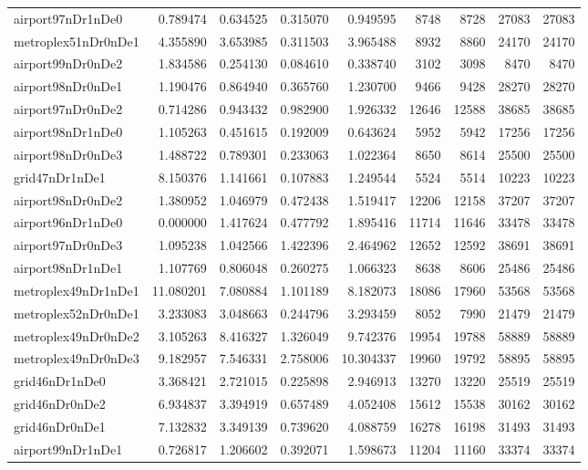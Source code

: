 \begin{longtable}{|l|r|r|r|r|r|r|r|r|}
airport97nDr1nDe0 & 0.789474 & 0.634525 & 0.315070 & 0.949595 & 8748 & 8728 & 27083 & 27083 \\
metroplex51nDr0nDe1 & 4.355890 & 3.653985 & 0.311503 & 3.965488 & 8932 & 8860 & 24170 & 24170 \\
airport99nDr0nDe2 & 1.834586 & 0.254130 & 0.084610 & 0.338740 & 3102 & 3098 & 8470 & 8470 \\
airport98nDr0nDe1 & 1.190476 & 0.864940 & 0.365760 & 1.230700 & 9466 & 9428 & 28270 & 28270 \\
airport97nDr0nDe2 & 0.714286 & 0.943432 & 0.982900 & 1.926332 & 12646 & 12588 & 38685 & 38685 \\
airport98nDr1nDe0 & 1.105263 & 0.451615 & 0.192009 & 0.643624 & 5952 & 5942 & 17256 & 17256 \\
airport98nDr0nDe3 & 1.488722 & 0.789301 & 0.233063 & 1.022364 & 8650 & 8614 & 25500 & 25500 \\
grid47nDr1nDe1 & 8.150376 & 1.141661 & 0.107883 & 1.249544 & 5524 & 5514 & 10223 & 10223 \\
airport98nDr0nDe2 & 1.380952 & 1.046979 & 0.472438 & 1.519417 & 12206 & 12158 & 37207 & 37207 \\
airport96nDr1nDe0 & 0.000000 & 1.417624 & 0.477792 & 1.895416 & 11714 & 11646 & 33478 & 33478 \\
airport97nDr0nDe3 & 1.095238 & 1.042566 & 1.422396 & 2.464962 & 12652 & 12592 & 38691 & 38691 \\
airport98nDr1nDe1 & 1.107769 & 0.806048 & 0.260275 & 1.066323 & 8638 & 8606 & 25486 & 25486 \\
metroplex49nDr1nDe1 & 11.080201 & 7.080884 & 1.101189 & 8.182073 & 18086 & 17960 & 53568 & 53568 \\
metroplex52nDr0nDe1 & 3.233083 & 3.048663 & 0.244796 & 3.293459 & 8052 & 7990 & 21479 & 21479 \\
metroplex49nDr0nDe2 & 3.105263 & 8.416327 & 1.326049 & 9.742376 & 19954 & 19788 & 58889 & 58889 \\
metroplex49nDr0nDe3 & 9.182957 & 7.546331 & 2.758006 & 10.304337 & 19960 & 19792 & 58895 & 58895 \\
grid46nDr1nDe0 & 3.368421 & 2.721015 & 0.225898 & 2.946913 & 13270 & 13220 & 25519 & 25519 \\
grid46nDr0nDe2 & 6.934837 & 3.394919 & 0.657489 & 4.052408 & 15612 & 15538 & 30162 & 30162 \\
grid46nDr0nDe1 & 7.132832 & 3.349139 & 0.739620 & 4.088759 & 16278 & 16198 & 31493 & 31493 \\
airport99nDr1nDe1 & 0.726817 & 1.206602 & 0.392071 & 1.598673 & 11204 & 11160 & 33374 & 33374 \\

\end{longtable}
